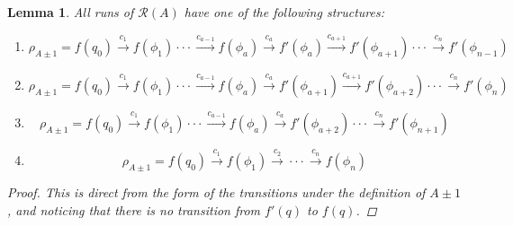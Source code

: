 \documentclass{article}
\newcommand{\lra}{\longrightarrow}
\newtheorem{lemma}{Lemma}
\begin{document}
\begin{lemma}\label{LemmaTypesOfRuns}
    All runs of $\mathcal{R}(A)$ have one of the following structures:
    \begin{enumerate}
        \item \begin{equation*}
            \rho_{A\pm 1} = f(q_0) \overset{c_1}{\lra}
            f(\phi_1) \cdot\cdot\cdot\overset{c_{a-1}}{\lra}
            f(\phi_a) \overset{c_{a}}{\lra} f'(\phi_a)
            \overset{c_{a+1}}{\lra} f'(\phi_{a + 1})  \cdot
            \cdot \cdot \overset{c_n}{\lra} f'(\phi_{n-1})
              \end{equation*}
        \item \begin{equation*}
            \rho_{A\pm 1} = f(q_0) \overset{c_1}{\lra}
            f(\phi_1) \cdot\cdot\cdot\overset{c_{a-1}}{\lra}
            f(\phi_a) \overset{c_{a}}{\lra} f'(\phi_{a+1})
            \overset{c_{a+1}}{\lra} f'(\phi_{a + 2})  \cdot
            \cdot \cdot \overset{c_n}{\lra} f'(\phi_n)
              \end{equation*}
        \item \begin{equation*}
            \rho_{A\pm 1} = f(q_0) \overset{c_1}{\lra}
            f(\phi_1) \cdot\cdot\cdot\overset{c_{a-1}}{\lra}
            f(\phi_a) \overset{c_{a}}{\lra} f'(\phi_{a+2})
              \cdot
            \cdot \cdot \overset{c_n}{\lra} f'(\phi_{n + 1})
              \end{equation*}
        \item \begin{equation*}
                \rho_{A\pm1} = f(q_0) \overset{c_1}{\lra} f(\phi_1)
                \overset{c_2}{\lra} \cdot\cdot\cdot
                \overset{c_n}{\lra}f(\phi_n)
              \end{equation*}
    \end{enumerate}
    \begin{proof}

    This is direct from the form of the transitions under the definition of $A \pm 1$, and noticing that there is no transition from $f'(q)$ to $f(q)$.
    \end{proof}
\end{lemma}
\end{document}
